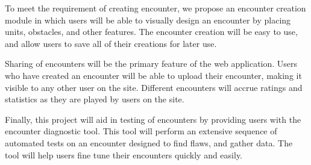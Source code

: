 \documentclass[12pt,a4paper]{report}
\begin{document}
To meet the requirement of creating encounter, we propose an encounter creation module in which users will be able to visually design an encounter by placing units, obstacles, and other features. The encounter creation will be easy to use, and allow users to save all of their creations for later use. 

Sharing of encounters will be the primary feature of the web application. Users who have created an encounter will be able to upload their encounter, making it visible to any other user on the site. Different encounters will accrue ratings and statistics as they are played by users on the site. 

Finally, this project will aid in testing of encounters by providing users with the encounter diagnostic tool. This tool will perform an extensive sequence of automated tests on an encounter designed to find flaws, and gather data. The tool will help users fine tune their encounters quickly and easily. 


		
\newpage
{}
\listoffigures

\newpage
{}
\listoftables

\newpage


\end{document}
